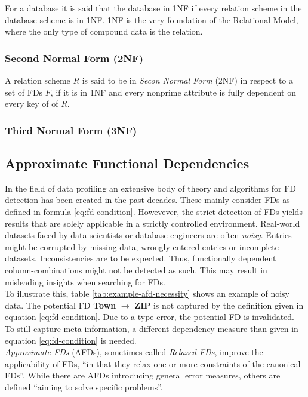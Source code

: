 For a database it is said that the database in 1NF if every relation scheme in the database scheme is in 1NF.
1NF is the very foundation of the Relational Model, where the only type of compound data is the relation.\cite[p.~6]{COD90}

\subsubsection{Second Normal Form (2NF)}
A relation scheme \(R\) is said to be in \emph{Secon Normal Form} (2NF) in respect to a set of FDs \(F\), if it is in 1NF and every nonprime attribute is fully dependent on every key of of \(R\).\cite[p.~99]{MAI83}

\subsubsection{Third Normal Form (3NF)}

\subsection{Approximate Functional Dependencies}
In the field of data profiling an extensive body of theory and algorithms for FD detection has been created in the past decades.\cite{PAP15}
These mainly consider FDs as defined in formula \ref{eq:fd-condition}.
Howevever, the strict detection of FDs yields results that are solely applicable in a strictly controlled environment.
Real-world datasets faced by data-scientists or database engineers are often \emph{noisy}.
Entries might be corrupted by missing data, wrongly entered entries or incomplete datasets.
Inconsistencies are to be expected.
Thus, functionally dependent column-combinations might not be detected as such. This may result in misleading insights when searching for FDs. \\

To illustrate this, table \ref{tab:example-afd-necessity} shows an example of noisy data.
The potential FD \textbf{Town} \(\to\) \textbf{ZIP} is not captured by the definition given in equation \ref{eq:fd-condition}.
Due to a type-error, the potential FD is invalidated.
To still capture meta-information, a different dependency-measure than given in equation \ref{eq:fd-condition} is needed. \\

\emph{Approximate FDs} (AFDs), sometimes called \emph{Relaxed FDs}, improve the applicability of FDs, ``in that they relax one or more constraints of the canonical FDs''\cite[p.~1]{CAR16}. While there are AFDs introducing general error measures, others are defined ``aiming to solve specific problems''\cite[p.~1]{CAR16}. \\

